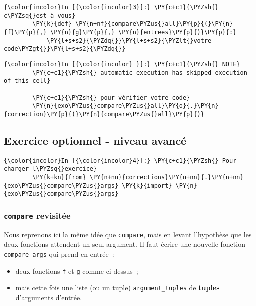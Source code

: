    \begin{Verbatim}[commandchars=\\\{\}]
{\color{incolor}In [{\color{incolor}3}]:} \PY{c+c1}{\PYZsh{} c\PYZsq{}est à vous}
        \PY{k}{def} \PY{n+nf}{compare\PYZus{}all}\PY{p}{(}\PY{n}{f}\PY{p}{,} \PY{n}{g}\PY{p}{,} \PY{n}{entrees}\PY{p}{)}\PY{p}{:}
            \PY{l+s+s2}{\PYZdq{}}\PY{l+s+s2}{\PYZlt{}votre code\PYZgt{}}\PY{l+s+s2}{\PYZdq{}}
\end{Verbatim}


    \begin{Verbatim}[commandchars=\\\{\}]
{\color{incolor}In [{\color{incolor} }]:} \PY{c+c1}{\PYZsh{} NOTE}
        \PY{c+c1}{\PYZsh{} automatic execution has skipped execution of this cell}
        
        \PY{c+c1}{\PYZsh{} pour vérifier votre code}
        \PY{n}{exo\PYZus{}compare\PYZus{}all}\PY{o}{.}\PY{n}{correction}\PY{p}{(}\PY{n}{compare\PYZus{}all}\PY{p}{)}
\end{Verbatim}


    \hypertarget{exercice-optionnel---niveau-avancuxe9}{%
\subsection{Exercice optionnel - niveau
avancé}\label{exercice-optionnel---niveau-avancuxe9}}

    \begin{Verbatim}[commandchars=\\\{\}]
{\color{incolor}In [{\color{incolor}4}]:} \PY{c+c1}{\PYZsh{} Pour charger l\PYZsq{}exercice}
        \PY{k+kn}{from} \PY{n+nn}{corrections}\PY{n+nn}{.}\PY{n+nn}{exo\PYZus{}compare\PYZus{}args} \PY{k}{import} \PY{n}{exo\PYZus{}compare\PYZus{}args}
\end{Verbatim}


    \hypertarget{compare-revisituxe9e}{%
\subsubsection{\texorpdfstring{\texttt{compare}
revisitée}{compare revisitée}}\label{compare-revisituxe9e}}

    Nous reprenons ici la même idée que \texttt{compare}, mais en levant
l'hypothèse que les deux fonctions attendent un seul argument. Il faut
écrire une nouvelle fonction \texttt{compare\_args} qui prend en
entrée~:

\begin{itemize}
\tightlist
\item
  deux fonctions \texttt{f} et \texttt{g} comme ci-dessus~;
\item
  mais cette fois une liste (ou un tuple) \texttt{argument\_tuples} de
  \textbf{tuples} d'arguments d'entrée.
\end{itemize}

